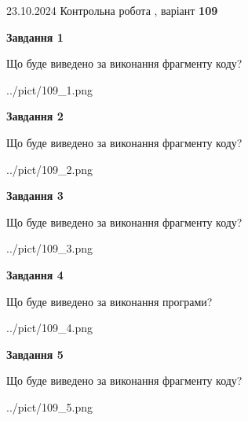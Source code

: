 \documentclass[12pt, ukrainian]{article}
\begin{document}
{\Large{23.10.2024 Контрольна робота , варіант  \No \textbf { 109 }\par}}
{
\begin {large}
{\begin {center}\textbf{Завдання 1}\end {center}}

Що буде виведено за виконання фрагменту коду?\par
\begin{center}
	{../pict/109_1.png}
\end{center}
\newpage

{\begin {center}\textbf{Завдання 2}\end {center}}

Що буде виведено за виконання фрагменту коду?\par
\begin{center}
	{../pict/109_2.png}
\end{center}
\newpage

{\begin {center}\textbf{Завдання 3}\end {center}}

Що буде виведено за виконання фрагменту коду?\par
\begin{center}
	{../pict/109_3.png}
\end{center}
\newpage

{\begin {center}\textbf{Завдання 4}\end {center}}

Що буде виведено за виконання програми?\par
\begin{center}
	{../pict/109_4.png}
\end{center}
\newpage

{\begin {center}\textbf{Завдання 5}\end {center}}

Що буде виведено за виконання фрагменту коду?\par
\begin{center}
	{../pict/109_5.png}
\end{center}
\newpage


\end{large}}
\end{document}
